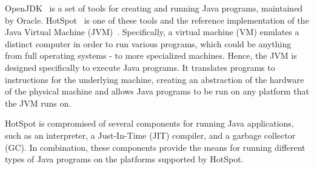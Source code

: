 
OpenJDK~\cite{openjdk} is a set of tools for creating and running Java programs, maintained by Oracle. HotSpot~\cite{hotspot} is one of these tools and the reference implementation of the Java Virtual Machine (JVM)~\cite{JVM}. Specifically, a virtual machine (VM) emulates a distinct computer in order to run various programs, which could be anything from full operating systems - to more specialized machines. Hence, the JVM is designed specifically to execute Java programs. It translates programs to instructions for the underlying machine, creating an abstraction of the hardware of the physical machine and allows Java programs to be run on any platform that the JVM runs on.

HotSpot is compromised of several components for running Java applications, such as an interpreter, a Just-In-Time (JIT) compiler, and a garbage collector (GC). In combination, these components provide the means for running different types of Java programs on the platforms supported by HotSpot.


